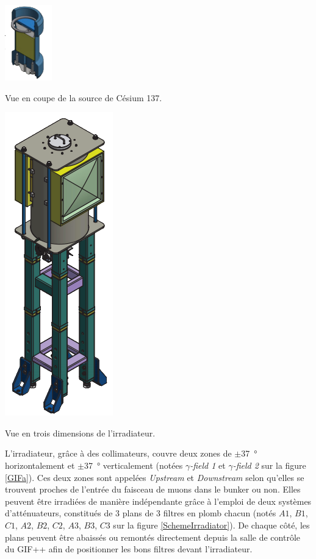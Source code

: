 \marginpar
{
	\centering
	\includegraphics[width=0.5\marginparwidth]{GLA/Source.png}
	\captionsetup{type=figure}\caption{Vue en coupe de la source de Césium \num{137}.}
	\label{Source}
}

\marginpar
{
	\centering
	\includegraphics[width=0.5\marginparwidth]{GLA/Irradiateur.png}
	\captionsetup{type=figure}\caption{Vue en trois dimensions de l'irradiateur.}
	\label{Irradiateur}
}

L'irradiateur, grâce à des collimateurs, couvre deux zones de $\pm$\SI{37}{\degree} horizontalement et $\pm$\SI{37}{\degree} verticalement (notées \textit{$\gamma$-field 1} et \textit{$\gamma$-field 2} sur la figure \ref{GIFa}). Ces deux zones sont appelées \textit{Upstream} et \textit{Downstream} selon qu'elles se trouvent proches de l'entrée du faisceau de muons dans le bunker ou non. Elles peuvent être irradiées de manière indépendante grâce à l'emploi de deux systèmes d'atténuateurs, constitués de \num{3} plans de \num{3} filtres en plomb chacun (notés $A1$, $B1$, $C1$, $A2$, $B2$, $C2$, $A3$, $B3$, $C3$ sur la figure \ref{SchemeIrradiator}). De chaque côté, les plans peuvent être abaissés ou remontés directement depuis la salle de contrôle du GIF++ afin de positionner les bons filtres devant l'irradiateur.

